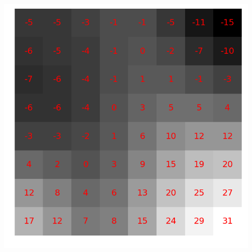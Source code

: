 \documentclass{beamer}
\begin{document}
\begin{frame}
\begin{center}
        \hspace{0.5cm}
        \includegraphics[scale=0.12]{fig/8x8random2.png}


\end{center}
\end{frame}
\end{document}
